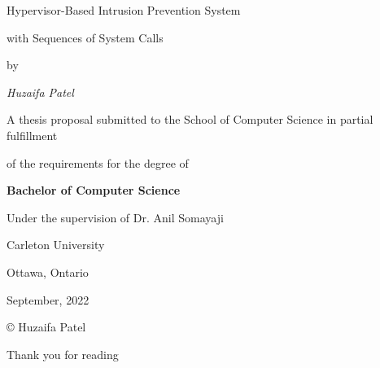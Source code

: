 \documentclass{report}
\begin{document}
\titleformat{\chapter}{}{}{0em}{\bf\LARGE}


\centerline{\Huge Hypervisor-Based Intrusion Prevention System}
\vspace{3mm}
\centerline{\Huge with Sequences of System Calls}
\vspace{14mm}
\centerline{\large by}
\vspace{15mm}
\centerline{\itshape \large Huzaifa Patel}
\vspace{2cm}
\centerline{\large A thesis proposal submitted to the School of Computer Science in partial fulfillment}
\vspace{2mm}
\centerline{\large of the requirements for the degree of}
\vspace{2cm}
\centerline{\bf \large Bachelor of Computer Science}
\vspace{3cm}
\centerline{\large Under the supervision of Dr. Anil Somayaji}
\vspace{3mm}
\centerline{\large Carleton University}
\vspace{3mm}
\centerline{\large Ottawa, Ontario}
\vspace{3mm}
\centerline{\large September, 2022}
\vspace{3cm}
\centerline{\large \copyright {} Huzaifa Patel}



\newpage
\clearpage
\vspace*{\fill}
\begin{center}
\large{Thank you for reading}
\end{center}
\vfill %
\clearpage
\end{document}
